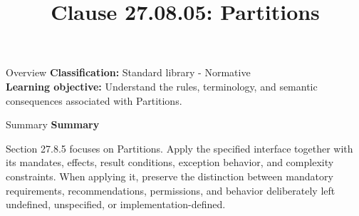 \documentclass[10pt,letterpaper]{article}
\title{Clause 27.08.05: Partitions}
\author{}
\date{}
\begin{document}
\maketitle
\begin{CornellOverviewBox}{Overview}
\textbf{Classification:} Standard library - Normative\\[2pt]
\textbf{Learning objective:} Understand the rules, terminology, and semantic consequences associated with Partitions.
\end{CornellOverviewBox}\begin{CornellSummaryBox}{Summary}
{\sffamily\bfseries\color{Accent} Summary}\par\vspace{3pt}Section 27.8.5 focuses on Partitions. Apply the specified interface together with its mandates, effects, result conditions, exception behavior, and complexity constraints. When applying it, preserve the distinction between mandatory requirements, recommendations, permissions, and behavior deliberately left undefined, unspecified, or implementation-defined.
\end{CornellSummaryBox}
\end{document}
